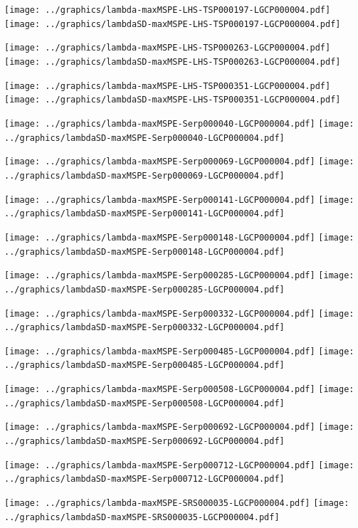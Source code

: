 \documentclass[review]{elsarticle}
\begin{document}
\texttt{[image: ../graphics/lambda-maxMSPE-LHS-TSP000197-LGCP000004.pdf]}
\texttt{[image: ../graphics/lambdaSD-maxMSPE-LHS-TSP000197-LGCP000004.pdf]}

\texttt{[image: ../graphics/lambda-maxMSPE-LHS-TSP000263-LGCP000004.pdf]}
\texttt{[image: ../graphics/lambdaSD-maxMSPE-LHS-TSP000263-LGCP000004.pdf]}

\texttt{[image: ../graphics/lambda-maxMSPE-LHS-TSP000351-LGCP000004.pdf]}
\texttt{[image: ../graphics/lambdaSD-maxMSPE-LHS-TSP000351-LGCP000004.pdf]}

\texttt{[image: ../graphics/lambda-maxMSPE-Serp000040-LGCP000004.pdf]}
\texttt{[image: ../graphics/lambdaSD-maxMSPE-Serp000040-LGCP000004.pdf]}

\texttt{[image: ../graphics/lambda-maxMSPE-Serp000069-LGCP000004.pdf]}
\texttt{[image: ../graphics/lambdaSD-maxMSPE-Serp000069-LGCP000004.pdf]}

\texttt{[image: ../graphics/lambda-maxMSPE-Serp000141-LGCP000004.pdf]}
\texttt{[image: ../graphics/lambdaSD-maxMSPE-Serp000141-LGCP000004.pdf]}

\texttt{[image: ../graphics/lambda-maxMSPE-Serp000148-LGCP000004.pdf]}
\texttt{[image: ../graphics/lambdaSD-maxMSPE-Serp000148-LGCP000004.pdf]}

\texttt{[image: ../graphics/lambda-maxMSPE-Serp000285-LGCP000004.pdf]}
\texttt{[image: ../graphics/lambdaSD-maxMSPE-Serp000285-LGCP000004.pdf]}

\texttt{[image: ../graphics/lambda-maxMSPE-Serp000332-LGCP000004.pdf]}
\texttt{[image: ../graphics/lambdaSD-maxMSPE-Serp000332-LGCP000004.pdf]}

\texttt{[image: ../graphics/lambda-maxMSPE-Serp000485-LGCP000004.pdf]}
\texttt{[image: ../graphics/lambdaSD-maxMSPE-Serp000485-LGCP000004.pdf]}

\texttt{[image: ../graphics/lambda-maxMSPE-Serp000508-LGCP000004.pdf]}
\texttt{[image: ../graphics/lambdaSD-maxMSPE-Serp000508-LGCP000004.pdf]}

\texttt{[image: ../graphics/lambda-maxMSPE-Serp000692-LGCP000004.pdf]}
\texttt{[image: ../graphics/lambdaSD-maxMSPE-Serp000692-LGCP000004.pdf]}

\texttt{[image: ../graphics/lambda-maxMSPE-Serp000712-LGCP000004.pdf]}
\texttt{[image: ../graphics/lambdaSD-maxMSPE-Serp000712-LGCP000004.pdf]}

\texttt{[image: ../graphics/lambda-maxMSPE-SRS000035-LGCP000004.pdf]}
\texttt{[image: ../graphics/lambdaSD-maxMSPE-SRS000035-LGCP000004.pdf]}
\end{document}
